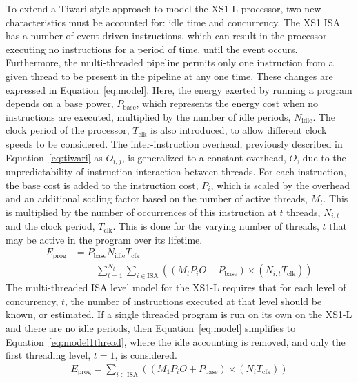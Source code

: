\documentclass[9pt,preprint]{sigplanconf}
\begin{document}
To extend a Tiwari style approach to model the XS1-L processor, two new
characteristics must be accounted for: idle time and concurrency. The XS1
ISA has a number of event-driven instructions, which can result in the processor
executing no instructions for a period of time, until the event occurs.
Furthermore, the multi-threaded pipeline permits only one instruction from a
given thread to be present in the pipeline at any one time. These changes are
expressed in Equation~\ref{eq:model}. Here, the energy exerted
by running a program depends on a base power, $P_\text{base}$, which represents
the energy cost when no instructions are executed, multiplied by the number of idle periods,
$N_\text{idle}$. The clock period of the processor, $T_\text{clk}$ is also
introduced, to allow different clock speeds to be considered. The
inter-instruction overhead, previously described in Equation~\ref{eq:tiwari} as
$O_{i,j}$, is generalized to a constant overhead, $O$, due to the
unpredictability of instruction interaction between threads. For each
instruction, the base cost is added to the instruction cost, $P_i$, which is
scaled by the overhead and an additional scaling factor based on the number of
active threads, $M_t$. This is multiplied by the number of occurrences of this
instruction at $t$ threads, $N_{i,t}$ and the clock period, $T_\text{clk}$. This
is done for the varying number of threads, $t$ that may be active in the program
over its lifetime.
\begin{align}
\nonumber E_{\text{prog}} &=
        P_{\text{base}}N_{\text{idle}}T_{\text{clk}} \\
     &\quad + \sum_{t=1}^{N_{t}}{\sum_{i \in \text{ISA}}{\left(\left(M_{t}P_{i}O
        + P_{\text{base}}\right) \times \left(N_{i,t} T_{\text{clk}}\right)\right) }}
\label{eq:model}
\end{align}
The multi-threaded ISA level model for the XS1-L requires that for each level of
concurrency, $t$, the number of instructions executed at that level should be
known, or estimated. If a single threaded program is run on its own on the XS1-L
and there are no idle periods, then Equation~\ref{eq:model} simplifies to
Equation~\ref{eq:model1thread}, where the idle accounting is removed, and only
the first threading level, $t=1$, is considered.
\begin{align}
E_{\text{prog}} = \sum_{i \in \text{ISA}}{\left(\left(M_{1}P_{i}O
    + P_{\text{base}}\right) \times \left(N_{i} T_{\text{clk}}\right)\right) }
\label{eq:model1thread}
\end{align}
\end{document}
